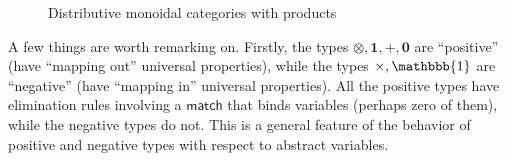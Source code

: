 \documentclass{book}
\def\idfunc{\mathsf{id}}
\let\types\vdash
\def\type{\;\ftype}
\def\unit{\mathbbb{1}}%
\def\ttt{\mathord{\ast}}%
\def\timesE{\ensuremath{\mathord{\times}E}}
\def\timesI{\ensuremath{\mathord{\times}I}}
\def\pair#1#2{\langle #1,#2\rangle}
\def\pr#1#2#3{\pi_{#1}^{#2,#3}}
\def\plusE{\mathord{+}E}
\def\plusI{\mathord{+}I}
\def\inl{\mathsf{inl}}
\def\inr{\mathsf{inr}}
\def\acase#1#2{\mathsf{match}_{#1+#2}}
\def\match{\mathsf{match}}
\def\zero{\mathbf{0}}
\def\abort{\match_{\zero}}
\def\one{\mathbf{1}}
\def\ott{\mathord{\star}}%
\let\tensor\otimes
\def\tensorI{\mathord{\tensor}I}
\def\tensorE{\mathord{\tensor}E}
\def\tpair#1#2{\text{\textlquill} #1,#2 \text{\textrquill}}%
\begin{document}
\begin{figure}
  \centering
  \caption{Distributive monoidal categories with products}
  \label{fig:moncat-prod-coprod}
\end{figure}

A few things are worth remarking on.
Firstly, the types $\tensor,\one,+,\zero$ are ``positive'' (have ``mapping out'' universal properties), while the types $\times,\unit$ are ``negative'' (have ``mapping in'' universal properties).
All the positive types have elimination rules involving a $\match$ that binds variables (perhaps zero of them), while the negative types do not.
This is a general feature of the behavior of positive and negative types with respect to abstract variables.
\end{document}

